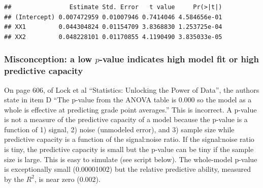 \documentclass[]{book}
\newenvironment{Shaded}{\begin{snugshade}}{\end{snugshade}}
\newcommand{\KeywordTok}[1]{\textcolor[rgb]{0.13,0.29,0.53}{\textbf{#1}}}
\newcommand{\DataTypeTok}[1]{\textcolor[rgb]{0.13,0.29,0.53}{#1}}
\newcommand{\DecValTok}[1]{\textcolor[rgb]{0.00,0.00,0.81}{#1}}
\newcommand{\FloatTok}[1]{\textcolor[rgb]{0.00,0.00,0.81}{#1}}
\newcommand{\StringTok}[1]{\textcolor[rgb]{0.31,0.60,0.02}{#1}}
\newcommand{\OperatorTok}[1]{\textcolor[rgb]{0.81,0.36,0.00}{\textbf{#1}}}
\newcommand{\NormalTok}[1]{#1}
\theoremstyle{definition}
\theoremstyle{definition}
\theoremstyle{definition}
\theoremstyle{remark}
\begin{document}
\begin{verbatim}
##                Estimate Std. Error   t value     Pr(>|t|)
## (Intercept) 0.007472959 0.01007946 0.7414046 4.584656e-01
## XX1         0.044304824 0.01154709 3.8368830 1.253725e-04
## XX2         0.048228101 0.01170855 4.1190490 3.835033e-05
\end{verbatim}

\subsubsection{\texorpdfstring{Misconception: a low \(p\)-value
indicates high model fit or high predictive
capacity}{Misconception: a low p-value indicates high model fit or high predictive capacity}}\label{misconception-a-low-p-value-indicates-high-model-fit-or-high-predictive-capacity}

On page 606, of Lock et al ``Statistics: Unlocking the Power of Data'',
the authors state in item D ``The p-value from the ANOVA table is 0.000
so the model as a whole is effective at predicting grade point
averages.'' This is incorrect. A p-value is not a measure of the
predictive capacity of a model because the p-value is a function of 1)
signal, 2) noise (unmodeled error), and 3) sample size while predictive
capacity is a function of the signal:noise ratio. If the signal:noise
ratio is tiny, the predictive capacity is small but the p-value can be
tiny if the sample size is large. This is easy to simulate (see script
below). The whole-model p-value is exceptionally small (0.00001002) but
the relative predictive ability, measured by the \(R^2\), is near zero
(0.002).

\begin{Shaded}
\end{Shaded}
\end{document}
